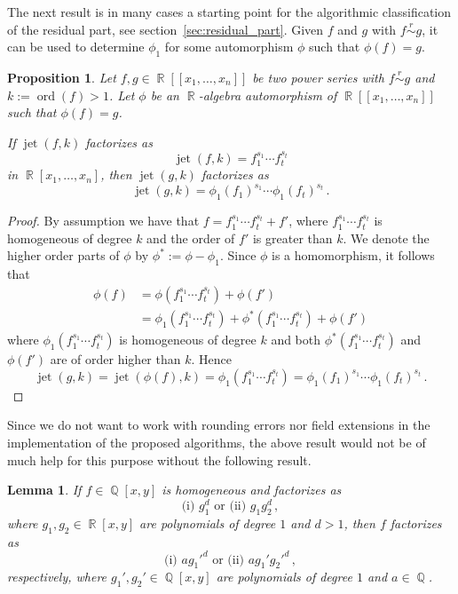\documentclass[noend]{amsproc}
\newtheorem{prop}[theorem]{Proposition}
\newtheorem{lemma}[theorem]{Lemma}
\theoremstyle{definition}
\newcommand{\requiv}{\ensuremath{\mathrel{\overset{r}{\sim}}}}
\DeclareMathOperator{\ord}{ord}
\DeclareMathOperator{\jet}{jet}
\DeclareMathOperator{\Q}{\mathbb{Q}}
\DeclareMathOperator{\R}{\mathbb{R}}
\begin{document}
The next result is in many cases a starting point for the algorithmic
classification of the residual part, see section~\ref{sec:residual_part}. Given
$f$ and $g$ with $f \requiv g$, it can be used to determine $\phi_1$ for some
automorphism $\phi$ such that $\phi(f) = g$.

\begin{prop}\label{kjet}
Let $f,g \in \R[[x_1,\ldots,x_n]]$ be two power series with $f \requiv g$ and
$k := \ord(f) > 1$. Let $\phi$ be an $\R$-algebra automorphism of
$\R[[x_1,\ldots,x_n]]$ such that $\phi(f)=g$.

If $\jet(f,k)$ factorizes as
\[
\jet(f,k) = f_1^{s_1} \cdots f_t^{s_t}
\]
in $\R[x_1,\ldots,x_n]$, then $\jet(g,k)$ factorizes as
\[
\jet(g,k) = \phi_1(f_1)^{s_1} \cdots \phi_1(f_t)^{s_t} \,.
\]
\end{prop}

\begin{proof}
By assumption we have that $f = f_1^{s_1} \cdots f_t^{s_t} + f'$, where
$f_1^{s_1} \cdots f_t^{s_t}$ is homogeneous of degree $k$ and the order of $f'$
is greater than $k$. We denote the higher order parts of $\phi$ by
$\phi^* := \phi-\phi_1$. Since $\phi$ is a homomorphism, it follows that
\begin{align*}
\phi(f) &= \phi(f_1^{s_1} \cdots f_t^{s_t}) + \phi(f') \\
&= \phi_1(f_1^{s_1} \cdots f_t^{s_t})
+ \phi^*(f_1^{s_1} \cdots f_t^{s_t}) + \phi(f')
\end{align*}
where $\phi_1(f_1^{s_1} \cdots f_t^{s_t})$ is homogeneous of degree $k$ and
both $\phi^*(f_1^{s_1} \cdots f_t^{s_t})$ and $\phi(f')$ are of order higher
than $k$. Hence
\[
\jet(g, k) = \jet(\phi(f), k) = \phi_1(f_1^{s_1} \cdots f_t^{s_t})
= \phi_1(f_1)^{s_1} \cdots \phi_1(f_t)^{s_t} \,.
\]
\end{proof}

Since we do not want to work with rounding errors nor field extensions in the
implementation of the proposed algorithms, the above result would not be of
much help for this purpose without the following result.

\begin{lemma}\label{x^3}
If $f \in \Q[x,y]$ is homogeneous and factorizes as
\[
\text{(i) } g_1^d \text{ or (ii) } g_1 g_2^d \,,
\]
where $g_1, g_2 \in \R[x,y]$ are polynomials of degree $1$ and $d > 1$, then
$f$ factorizes as
\[
\text{(i) } ag_1'^d \text{ or (ii) } ag_1' g_2'^d \,,
\]
respectively, where $g_1', g_2' \in \Q[x,y]$ are polynomials of degree $1$ and
$a \in \Q$.
\end{lemma}
\end{document}
